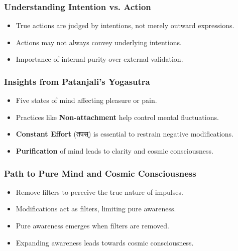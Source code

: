 \begin{frame}[fragile]\frametitle{Understanding Intention vs. Action}
    \begin{itemize}
        \item True actions are judged by intentions, not merely outward expressions.
        \item Actions may not always convey underlying intentions.
        \item Importance of internal purity over external validation.
    \end{itemize}
\end{frame}

\begin{frame}[fragile]\frametitle{Insights from Patanjali's Yogasutra}
    \begin{itemize}
        \item Five states of mind affecting pleasure or pain.
        \item Practices like \textbf{Non-attachment} help control mental fluctuations.
        \item \textbf{Constant Effort} (तपस्) is essential to restrain negative modifications.
        \item \textbf{Purification} of mind leads to clarity and cosmic consciousness.
    \end{itemize}
\end{frame}

\begin{frame}[fragile]\frametitle{Path to Pure Mind and Cosmic Consciousness}
    \begin{itemize}
        \item Remove filters to perceive the true nature of impulses.
        \item Modifications act as filters, limiting pure awareness.
        \item Pure awareness emerges when filters are removed.
        \item Expanding awareness leads towards cosmic consciousness.
    \end{itemize}
\end{frame}



